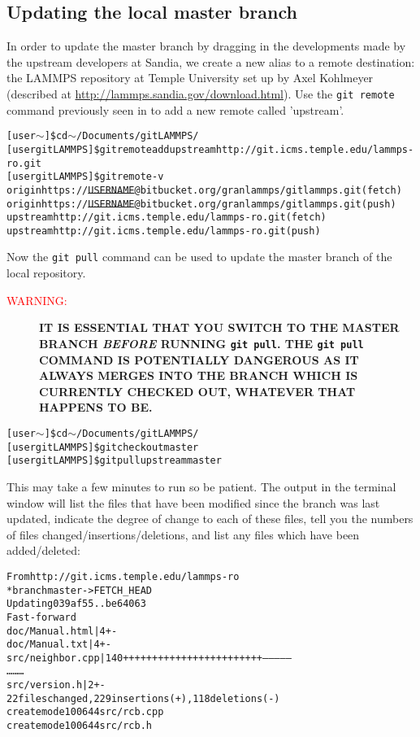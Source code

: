 \documentclass[a4paper,oneside,11pt]{article}
\begin{document}
\subsection{Updating the local master branch}\label{ssec:ulmb}
In order to update the master branch by dragging in the developments made by the upstream developers at Sandia, we create a new alias to a remote destination: the LAMMPS repository at Temple University set up by Axel Kohlmeyer (described at \url{http://lammps.sandia.gov/download.html}). Use the \texttt{git remote} command previously seen in  to add a new remote called 'upstream'. 
\begin{alltt}
[user \(\sim\)]\$ cd \(\sim\)/Documents/gitLAMMPS/
[user gitLAMMPS]\$ git remote add upstream http://git.icms.temple.edu/lammps-ro.git
[user gitLAMMPS]\$ git remote -v
origin	https://\sout{USERNAME}@bitbucket.org/granlammps/gitlammps.git (fetch)
origin	https://\sout{USERNAME}@bitbucket.org/granlammps/gitlammps.git (push)
upstream	http://git.icms.temple.edu/lammps-ro.git (fetch)
upstream	http://git.icms.temple.edu/lammps-ro.git (push)
\end{alltt}
Now the \texttt{git pull} command can be used to update the master branch of the local repository.
\begin{description}
 \item[\textcolor{red}{WARNING:}] \bfseries\MakeUppercase{It is essential that you switch to the master branch \emph{before} running \texttt{git pull}. The \texttt{git pull} command is potentially dangerous as it always merges into the branch which is currently checked out, whatever that happens to be.}
\end{description}
\begin{alltt}
[user \(\sim\)]\$ cd \(\sim\)/Documents/gitLAMMPS/
[user gitLAMMPS]\$ git checkout master
[user gitLAMMPS]\$ git pull upstream master
\end{alltt}
This may take a few minutes to run so be patient. The output in the terminal window will list the files that have been modified since the branch was last updated, indicate the degree of change to each of these files, tell you the numbers of files changed\slash insertions\slash deletions, and list any files which have been added\slash deleted:
\begin{alltt}
From http://git.icms.temple.edu/lammps-ro
 * branch            master     -> FETCH_HEAD
Updating 039af55..be64063
Fast-forward
 doc/Manual.html                 |    4 +-
 doc/Manual.txt                  |    4 +-
 src/neighbor.cpp                |  140 ++++++++++++++++++++++++---------------
\ldots\hspace*{10em}\ldots\hspace*{10em}\ldots
 src/version.h                   |    2 +-
 22 files changed, 229 insertions(+), 118 deletions(-)
 create mode 100644 src/rcb.cpp
 create mode 100644 src/rcb.h
\end{alltt}
\end{document}
